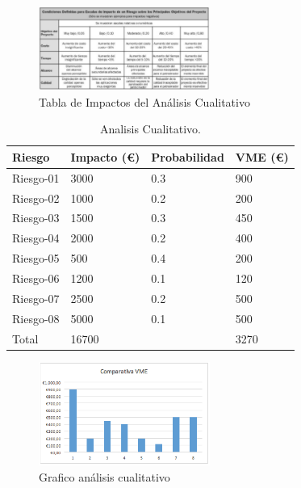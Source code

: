 \begin{figure}[H]
\begin{center}
\includegraphics[width=0.5\textwidth]{./img/ImpactoAnalisisCualitativo.png}
\end{center}
\caption{Tabla de Impactos del Análisis Cualitativo}
\label{tab:Tabla de Impactos del Análisis Cualitativo}
\end{figure}

\begin{table}[h]
\begin{center}
\begin{tabular}{ l l l l }
\hline
	Riesgo & Impacto (\euro) & Probabilidad & VME (\euro) \\ \hline \hline
	Riesgo-01 & 3000 & 0.3 & 900 \\ \hline
	Riesgo-02 & 1000 & 0.2 & 200 \\ \hline
	Riesgo-03 & 1500 & 0.3 & 450 \\ \hline
	Riesgo-04 & 2000 & 0.2 & 400 \\ \hline
	Riesgo-05 & 500 & 0.4 & 200 \\ \hline
	Riesgo-06 & 1200 & 0.1 & 120 \\ \hline
	Riesgo-07 & 2500 & 0.2 & 500 \\ \hline
	Riesgo-08 & 5000 & 0.1 & 500 \\ \hline
	Total & 16700 &  & 3270 \\ \hline
\end{tabular}
\caption{Analisis Cualitativo.}
\label{Analisis Cualitativo}
\end{center}
\end{table}

\begin{figure}[H]
\begin{center}
\includegraphics[width=0.5\textwidth]{./img/grafico2.png}
\end{center}
\caption{Grafico análisis cualitativo}
\label{tab:Grafico análisis cualitativo}
\end{figure}
